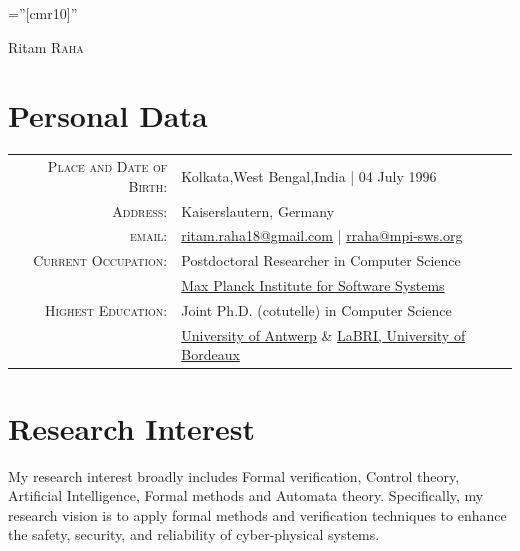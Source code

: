 \documentclass[a4paper,10pt]{article}
\begin{document}
\pagestyle{empty}
\font\fb=''[cmr10]'' 

\par{\centering
		{\Huge Ritam \textsc{Raha}
	}\bigskip\par}
	
\hfill {}

\section{Personal Data}
\begin{tabular}{rl}
    \textsc{Place and Date of Birth:} & Kolkata,West Bengal,India  | 04 July 1996 \\
    \textsc{Address:} &  Kaiserslautern, Germany\\
    \textsc{email:}     & \href{mailto:ritam.raha18@gmail.com}{ritam.raha18@gmail.com} | \href{mailto:rraha@mpi-sws.org}{rraha@mpi-sws.org}\\
    \textsc{Current Occupation:}     & Postdoctoral Researcher in Computer Science\\
    & \href{https://mpi-sws.org}{Max Planck Institute for Software Systems}\\ 
    \textsc{Highest Education:}     & Joint Ph.D. (cotutelle) in Computer Science\\
    & \href{https://www.uantwerpen.be/en/}{University of Antwerp} \& \href{https://www.labri.fr/}{LaBRI, University of Bordeaux}
\end{tabular}

\section{Research Interest}

My research interest broadly includes Formal verification, Control theory, Artificial Intelligence, Formal methods and Automata theory. Specifically, my research vision is to apply formal methods and verification techniques to enhance the safety, security, and reliability of cyber-physical systems.
\end{document}
